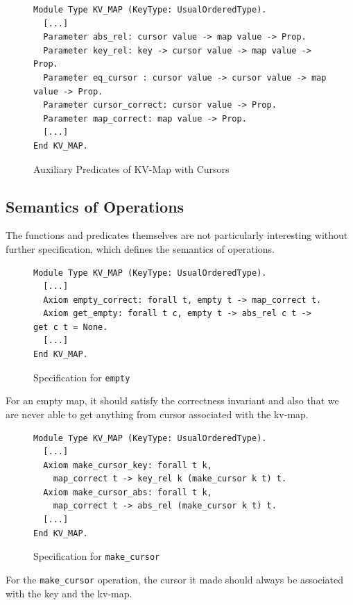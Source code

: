\documentclass[runningheads]{llncs}
\begin{document}
\begin{figure}[htbp]
  \centering
  \begin{verbatim}
Module Type KV_MAP (KeyType: UsualOrderedType).
  [...]
  Parameter abs_rel: cursor value -> map value -> Prop.
  Parameter key_rel: key -> cursor value -> map value -> Prop.
  Parameter eq_cursor : cursor value -> cursor value -> map value -> Prop.
  Parameter cursor_correct: cursor value -> Prop.
  Parameter map_correct: map value -> Prop.
  [...]
End KV_MAP.
\end{verbatim}
  \caption{Auxiliary Predicates of KV-Map with Cursors}\label{fig:aux}
\end{figure}

\subsection{Semantics of Operations}

The functions and predicates themselves are not particularly interesting without
further specification, which defines the semantics of operations.

\begin{figure}[htbp]
  \centering
  \begin{verbatim}
Module Type KV_MAP (KeyType: UsualOrderedType).
  [...]
  Axiom empty_correct: forall t, empty t -> map_correct t.
  Axiom get_empty: forall t c, empty t -> abs_rel c t -> get c t = None.
  [...]
End KV_MAP.
\end{verbatim}
  \caption{Specification for \texttt{empty}}\label{fig:empty}
\end{figure}

For an empty map, it should satisfy the correctness invariant and also that we
are never able to get anything from cursor associated with the kv-map. 

\begin{figure}[htbp]
  \centering
  \begin{verbatim}
Module Type KV_MAP (KeyType: UsualOrderedType).
  [...]
  Axiom make_cursor_key: forall t k,
    map_correct t -> key_rel k (make_cursor k t) t.
  Axiom make_cursor_abs: forall t k,
    map_correct t -> abs_rel (make_cursor k t) t.
  [...]
End KV_MAP.
\end{verbatim}
  \caption{Specification for \texttt{make\_cursor}}\label{fig:make}
\end{figure}

For the \texttt{make\_cursor} operation, the cursor it made should always be
associated with the key and the kv-map.
\end{document}
